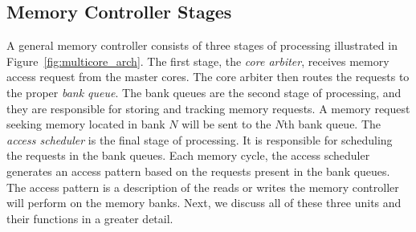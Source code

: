 \subsection{Memory Controller Stages}
A general memory controller consists of three stages of processing illustrated in Figure~\ref{fig:multicore_arch}. The first stage, the {\em core arbiter}, receives memory access request from the master cores. The core arbiter then routes the requests to the proper {\em bank queue}. The bank queues are the second stage of processing, and they are responsible for storing and tracking memory requests. A memory request seeking memory located in bank $N$ will be sent to the $N$th bank queue. The {\em access scheduler} is the final stage of processing. It is responsible for scheduling the requests in the bank queues. Each memory cycle, the access scheduler generates an access pattern based on the requests present in the bank queues. The access pattern is a description of the reads or writes the memory controller will perform on the memory banks. Next, we discuss all of these three units and their functions in a greater detail.
